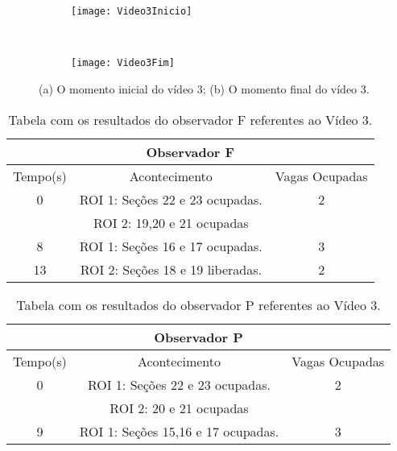 \begin{figure}[H]
\centering
\begin{subfigure}{.5\textwidth}
\centering
\texttt{[image: Video3Inicio]}
\caption{}
\end{subfigure}\
\begin{subfigure}{.5\textwidth}
\centering
\texttt{[image: Video3Fim]}
\caption{}
\end{subfigure}
\centering
\caption{(a) O momento inicial do vídeo 3; (b) O momento final do vídeo 3.}%
\label{}%
\end{figure}


\begin{table}[H]
\begin{center}
\begin{tabular}{|c||c||c|}
\hline
\multicolumn{3}{|c|}{Observador F}  \\ \hline \hline
Tempo(s) & Acontecimento & Vagas Ocupadas\\ \hline
0 & ROI 1: Seções 22 e 23 ocupadas. & 2 \\
 & ROI 2: 19,20 e 21 ocupadas & \\ \hline
8 & ROI 1: Seções 16 e 17 ocupadas. & 3\\ \hline
13 & ROI 2: Seções 18 e 19 liberadas. & 2\\
\hline
\end{tabular}
\end{center}
\caption{Tabela com os resultados do observador F referentes ao Vídeo 3.}
\label{tab:video3F}
\end{table}

\begin{table}[H]
\begin{center}
\begin{tabular}{|c||c||c|}
\hline
\multicolumn{3}{|c|}{Observador P}  \\ \hline \hline
Tempo(s) & Acontecimento & Vagas Ocupadas\\ \hline
0 & ROI 1: Seções 22 e 23 ocupadas. & 2 \\
 & ROI 2: 20 e 21 ocupadas &  \\ \hline
9 & ROI 1: Seções 15,16 e 17 ocupadas. & 3 \\
\hline
\end{tabular}
\end{center}
\caption{Tabela com os resultados do observador P referentes ao Vídeo 3.}
\label{tab:video3P}
\end{table}

